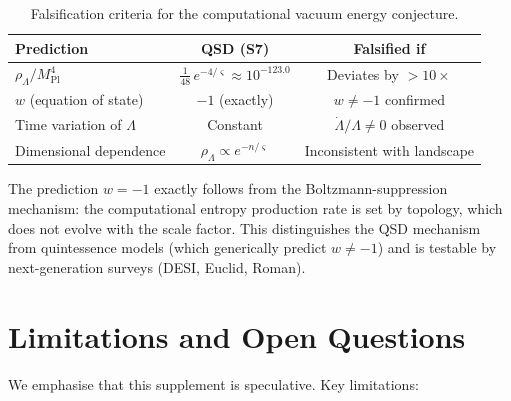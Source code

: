 \documentclass[11pt,a4paper]{article}
\theoremstyle{definition}
\newcommand{\gs}{\varsigma}                %
\newcommand{\Mpl}{M_{\text{Pl}}}
\newcommand{\rhoL}{\rho_{\Lambda}}
\begin{document}
\begin{table}[h]
\centering
\begin{tabular}{p{5cm}cc}
\toprule
\textbf{Prediction} & \textbf{QSD (S7)} & \textbf{Falsified if} \\
\midrule
$\rhoL/\Mpl^4$ & $\frac{1}{48}\,e^{-4/\gs} \approx 10^{-123.0}$ & Deviates by ${>}10\times$ \\[4pt]
$w$ (equation of state) & $-1$ (exactly) & $w \neq -1$ confirmed \\
Time variation of $\Lambda$ & Constant & $\dot{\Lambda}/\Lambda \neq 0$ observed \\
Dimensional dependence & $\rhoL \propto e^{-n/\gs}$ & Inconsistent with landscape \\
\bottomrule
\end{tabular}
\caption{Falsification criteria for the computational vacuum energy conjecture.}
\end{table}

The prediction $w = -1$ exactly follows from the Boltzmann-suppression mechanism: the computational entropy production rate is set by topology, which does not evolve with the scale factor. This distinguishes the QSD mechanism from quintessence models (which generically predict $w \neq -1$) and is testable by next-generation surveys (DESI, Euclid, Roman).


\section{Limitations and Open Questions}

We emphasise that this supplement is speculative. Key limitations:
\end{document}
